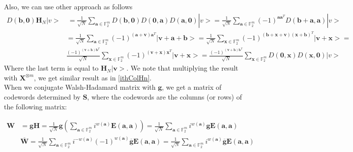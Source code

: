 \documentclass{article}
\begin{document}
		Also, we can use other approach as follows
		\begin{align*}
			D\left(\mathbf{b},\mathbf{0}\right) \mathbf{H}_N |v>& \: = \frac{1}{\sqrt{N}}\sum_{\mathbf{a} \in \mathbb{F}_2^m}{D\left(\mathbf{b},\mathbf{0}\right) D\left(\mathbf{0},\mathbf{a}\right) D\left(\mathbf{a},\mathbf{0}\right)}|v> = \frac{1}{\sqrt{N}}\sum_{\mathbf{a} \in \mathbb{F}_2^m}{(-1)^{\mathbf{a}\mathbf{a}^T} D\left(\mathbf{b}+\mathbf{a},\mathbf{a}\right)}|v> \\
			& = \frac{1}{\sqrt{N}}\sum_{\mathbf{a} \in \mathbb{F}_2^m}{(-1)^{(\mathbf{a+v})\mathbf{a}^T} | \mathbf{v}+\mathbf{a}+\mathbf{b}>}=\frac{1}{\sqrt{N}}\sum_{\mathbf{x} \in \mathbb{F}_2^m}{(-1)^{(\mathbf{b+x+v})(\mathbf{x+b})^T} | \mathbf{v}+\mathbf{x}>}= \\
			&\frac{(-1)^{(\mathbf{v+b})
					\mathbf{b}^T }}{\sqrt{N}}\sum_{\mathbf{x} \in \mathbb{F}_2^m}{(-1)^{(\mathbf{v+x})\mathbf{x}^T} | \mathbf{v}+\mathbf{x}>}=\frac{(-1)^{(\mathbf{v+b})
					\mathbf{b}^T }}{\sqrt{N}}\sum_{\mathbf{x} \in \mathbb{F}_2^m}{D(\mathbf{0, x}) D(\mathbf{x, 0})}|v>
		\end{align*}
		Where the last term is equal to $\mathbf{H}_N | \mathbf{v}>$. We note that multiplying the result with $\mathbf{X}^{\otimes m}$, we get similar result as in \eqref{ithColHn}.
	\\
	
	When we conjugate Walsh-Hadamard matrix with $\mathbf{g}$, we get a matrix of codewords determined by $\mathbf{S}$, where the codewords are the columns (or rows) of the following matrix:
	
	\begin{align*}
		\mathbf{W} &= \mathbf{g}\mathbf{H} = \frac{1}{\sqrt{N}}\mathbf{g}\left(\sum_{\mathbf{a} \in \mathbb{F}^m_2} i^{w(\mathbf{a})}\mathbf{E}(\mathbf{a},\mathbf{a})\right) = \frac{1}{\sqrt{N}}\sum_{\mathbf{a} \in \mathbb{F}^m_2} i^{w(\mathbf{a})}\mathbf{g}\mathbf{E}(\mathbf{a},\mathbf{a}) \\
		&\overline{\mathbf{W}} = \frac{1}{\sqrt{N}}\sum_{\mathbf{a} \in \mathbb{F}^m_2} i^{-w(\mathbf{a})}(-1)^{w(\mathbf{a})}\overline{\mathbf{g}}\mathbf{E}(\mathbf{a},\mathbf{a}) = \frac{1}{\sqrt{N}}\sum_{\mathbf{a} \in \mathbb{F}^m_2} i^{w(\mathbf{a})}\overline{\mathbf{g}}\mathbf{E}(\mathbf{a},\mathbf{a})
	\end{align*}
	\\
	
\end{document}
